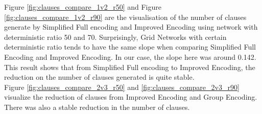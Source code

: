 \noindent Figure \ref{fig:clauses_compare_1v2_r50} and Figure \ref{fig:clauses_compare_1v2_r90} are the visualisation of the number of clauses generate by Simplified Full encoding and Improved Encoding using network with deterministic ratio 50 and 70. Surprisingly, Grid Networks with certain deterministic ratio tends to have the same slope when comparing Simplified Full Encoding and Improved Encoding. In our case, the slope here was around 0.142. This result shows that from Simplified Full encoding to Improved Encoding, the reduction on the number of clauses generated is quite stable.\\

\noindent Figure \ref{fig:clauses_compare_2v3_r50} and  \ref{fig:clauses_compare_2v3_r90} visualize the reduction of clauses from Improved Encoding and Group Encoding. There was also a stable reduction in the number of clauses.


